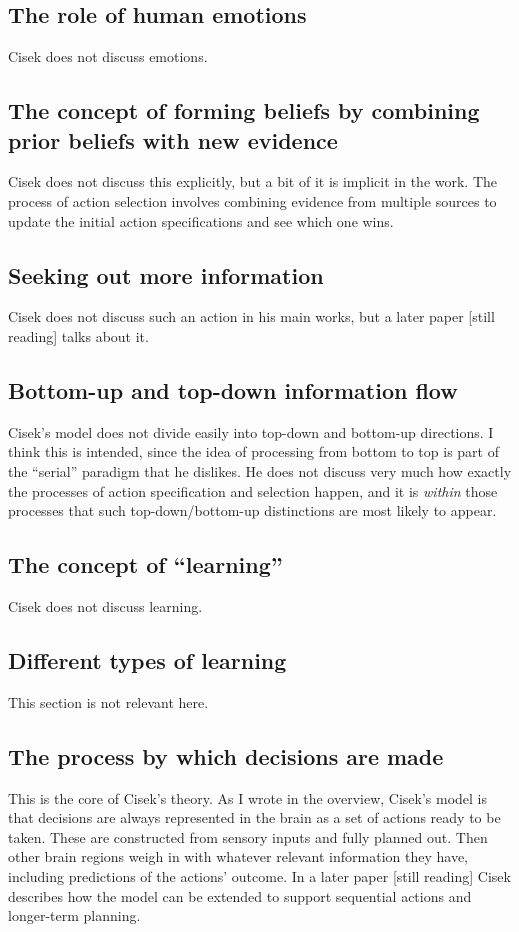 \documentclass[10pt,a4paper]{article}
\newcommand{\nquote}[1]{``{#1}''}
\begin{document}
\subsection{The role of human emotions}
Cisek does not discuss emotions.

\subsection{The concept of forming beliefs by combining prior beliefs with new evidence}
Cisek does not discuss this explicitly, but a bit of it is implicit in the work. The process of action selection involves combining evidence from multiple sources to update the initial action specifications and see which one wins.

\subsection{Seeking out more information}
Cisek does not discuss such an action in his main works, but a later paper [still reading] talks about it.

\subsection{Bottom-up and top-down information flow}
Cisek's model does not divide easily into top-down and bottom-up directions. I think this is intended, since the idea of processing from bottom to top is part of the \nquote{serial} paradigm that he dislikes. He does not discuss very much how exactly the processes of action specification and selection happen, and it is \emph{within} those processes that such top-down/bottom-up distinctions are most likely to appear.

\subsection{The concept of \nquote{learning}}
Cisek does not discuss learning.

\subsection{Different types of learning}
This section is not relevant here.

\subsection{The process by which decisions are made}
This is the core of Cisek's theory. As I wrote in the overview, Cisek's model is that decisions are always represented in the brain as a set of actions ready to be taken. These are constructed from sensory inputs and fully planned out. Then other brain regions weigh in with whatever relevant information they have, including predictions of the actions' outcome. In a later paper [still reading] Cisek describes how the model can be extended to support sequential actions and longer-term planning.
\end{document}
